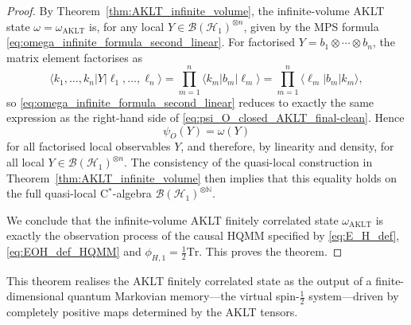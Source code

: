 \documentclass[11pt,a4paper]{article}
\def\Tr{\mathrm{Tr}}
\begin{document}
\begin{proof}
By Theorem~\ref{thm:AKLT_infinite_volume}, the infinite-volume AKLT state $\omega=\omega_{\mathrm{AKLT}}$ is, for any local $Y\in\mathcal{B}(\mathcal{H}_{1})^{\otimes n}$, given by the MPS formula \eqref{eq:omega_infinite_formula_second_linear}. For factorised $Y=b_1\otimes\cdots\otimes b_n$, the matrix element factorises as
\[
\langle k_1,\dots,k_n|Y|\ell_1,\dots,\ell_n\rangle
=
\prod_{m=1}^n \langle k_m|b_m|\ell_m\rangle
=
\prod_{m=1}^n \langle \ell_m|b_m|k_m\rangle,
\]
so \eqref{eq:omega_infinite_formula_second_linear} reduces to exactly the same expression as the right-hand side of \eqref{eq:psi_O_closed_AKLT_final-clean}. Hence
\[
\psi_{O}(Y)=\omega(Y)
\]
for all factorised local observables $Y$, and therefore, by linearity and density, for all local $Y\in\mathcal{B}(\mathcal{H}_{1})^{\otimes n}$. The consistency of the quasi-local construction in Theorem~\ref{thm:AKLT_infinite_volume} then implies that this equality holds on the full quasi-local C\(^*\)-algebra $\mathcal{B}(\mathcal{H}_{1})^{\otimes\mathbb{N}}$.

We conclude that the infinite-volume AKLT finitely correlated state $\omega_{\mathrm{AKLT}}$ is exactly the observation process of the causal HQMM specified by \eqref{eq:E_H_def}, \eqref{eq:EOH_def_HQMM} and $\phi_{H,1}=\tfrac{1}{2}\Tr$. This proves the theorem.
\end{proof}


This theorem realises the AKLT finitely correlated state as the output of a finite-dimensional quantum Markovian memory—the virtual spin-\(\tfrac12\) system—driven by completely positive maps determined by the AKLT tensors.%
\end{document}
